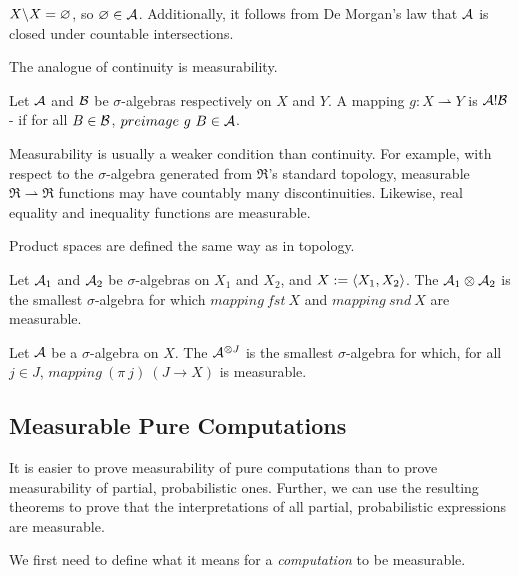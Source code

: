 \documentclass[preprint]{sigplanconf}
\newcommand{\pto}{\rightharpoonup}
\begin{document}
$X \backslash X = \varnothing$, so $\varnothing \in \mathcal{A}$.
Additionally, it follows from De Morgan's law that $\mathcal{A}$ is closed under countable intersections.

The analogue of continuity is measurability.

\begin{definition}
Let $\mathcal{A}$ and $\mathcal{B}$ be $\sigma$-algebras respectively on $X$ and $Y$.
A mapping $g : X \pto Y$ is $\mathcal{A}!\mathcal{B}$- if for all $B \in \mathcal{B}$, $preimage~g~B \in \mathcal{A}$.
\end{definition}

Measurability is usually a weaker condition than continuity.
For example, with respect to the $\sigma$-algebra generated from $\Re$'s standard topology, measurable $\Re \pto \Re$ functions may have countably many discontinuities.
Likewise, real equality and inequality functions are measurable.

Product spaces are defined the same way as in topology.

\begin{definition}
Let $\mathcal{A}_1$ and $\mathcal{A}_2$ be $\sigma$-algebras on $X_1$ and $X_2$, and $X := \langle{X_1,X_2}\rangle$.
The  $\mathcal{A}_1 \otimes \mathcal{A}_2$ is the smallest $\sigma$-algebra for which $mapping~fst~X$ and $mapping~snd~X$ are measurable.
\label{def:finite-product-sigma-algebra}
\end{definition}

\begin{definition}
Let $\mathcal{A}$ be a $\sigma$-algebra on $X$.
The  $\mathcal{A}^{\otimes J}$ is the smallest $\sigma$-algebra for which, for all $j \in J$, $mapping~(\pi~j)~(J \to X)$ is measurable.
\label{def:arbitrary-product-sigma-algebra}
\end{definition}

\subsection{Measurable Pure Computations}

It is easier to prove measurability of pure computations than to prove measurability of partial, probabilistic ones.
Further, we can use the resulting theorems to prove that the interpretations of all partial, probabilistic expressions are measurable.

We first need to define what it means for a \emph{computation} to be measurable.
\end{document}
